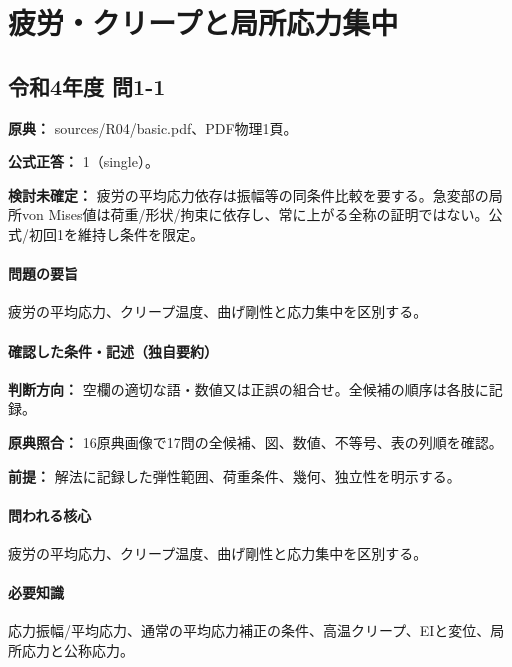 \section{疲労・クリープと局所応力集中}

\subsection{令和4年度 問1-1}
\label{q:r04-reg-basic-1-1}

\noindent\textbf{原典：} sources/R04/basic.pdf、PDF物理1頁。

\textbf{公式正答：} 1（single）。

\par\textbf{検討未確定：} 疲労の平均応力依存は振幅等の同条件比較を要する。急変部の局所von Mises値は荷重/形状/拘束に依存し、常に上がる全称の証明ではない。公式/初回1を維持し条件を限定。

\paragraph{問題の要旨} 疲労の平均応力、クリープ温度、曲げ剛性と応力集中を区別する。

\paragraph{確認した条件・記述（独自要約）}\mbox{}\par

\noindent\textbf{判断方向：} 空欄の適切な語・数値又は正誤の組合せ。全候補の順序は各肢に記録。\par

\noindent\textbf{原典照合：} 16原典画像で17問の全候補、図、数値、不等号、表の列順を確認。\par

\noindent\textbf{前提：} 解法に記録した弾性範囲、荷重条件、幾何、独立性を明示する。\par

\paragraph{問われる核心} 疲労の平均応力、クリープ温度、曲げ剛性と応力集中を区別する。

\paragraph{必要知識} 応力振幅/平均応力、通常の平均応力補正の条件、高温クリープ、EIと変位、局所応力と公称応力。

